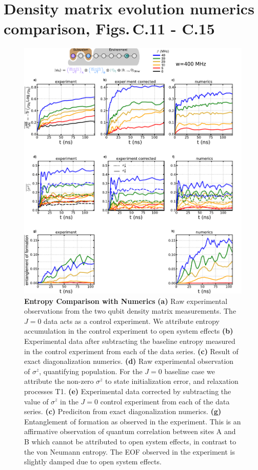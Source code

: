 \section{Density matrix evolution numerics comparison, Figs.\,C.11 - C.15}
\begin{figure}[tbh]
\centering
\includegraphics[width=140mm, keepaspectratio]{./PDF/dat_cor_num_superposition_linear.pdf}
\caption{\textbf{Entropy Comparison with Numerics}
\footnotesize{
\textbf{(a)} Raw experimental observations from the two qubit density matrix measurements.  The $J=0$ data acts as a control experiment.
We attribute entropy accumulation in the control experiment to open system effects
\textbf{(b)} Experimental data after subtracting the baseline entropy measured in the control experiment from each of the data series.
\textbf{(c)} Result of exact diagonalization numerics.
\textbf{(d)} Raw experimental observation of $\sigma^z$, quantifying population.
For the $J=0$ baseline case we attribute the non-zero $\sigma^z$ to state initialization error, and relaxation processes T1.
\textbf{(e)} Experimental data corrected by subtracting the value of $\sigma^z$ in the $J=0$ control experiment from each of the data series.
\textbf{(c)} Prediciton from exact diagonalization numerics.
\textbf{(g)} Entanglement of formation as observed in the experiment.
This is an affirmative observation of quantum correlation between sites A and B which cannot be attributed to open system effects, in contrast to the von Neumann entropy.
The EOF observed in the experiment is slightly damped due to open system effects.}
}
\label{numerics_comparison_superposition_linear}
\end{figure}

